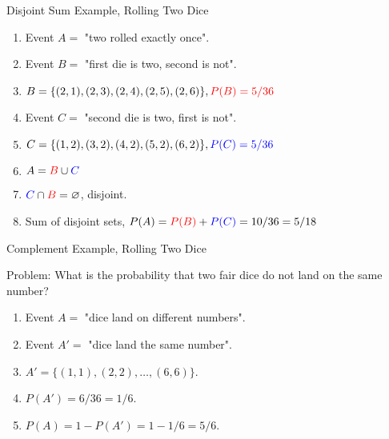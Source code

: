 \documentclass{beamer}
\newcommand{\blue}[1]{{\color{blue} #1}}
\newcommand{\red}[1]{{\color{red} #1}}
\let\emptyset\varnothing
\begin{document}
    \begin{frame}{Disjoint Sum Example, Rolling Two Dice}
        \begin{enumerate}
            \item Event $A =$ "two rolled exactly once".
            \item Event $B =$ "first die is two, second is not".
            \item $B = \{ (2,1),(2,3),(2,4),(2,5),(2,6) \}, \red{P(B) = 5/36}$
            \item Event $C =$ "second die is two, first is not".
            \item $C = \{ (1,2),(3,2),(4,2),(5,2),(6,2) \}, \blue{P(C) = 5/36}$
            \item $A = \red{B} \cup \blue{C}$
            \item $\blue{C} \cap \red{B} = \emptyset$, disjoint.
            \item Sum of disjoint sets, $P(A) = \red{P(B)} + \blue{P(C)} = 10/36 = 5/18$
        \end{enumerate}

    \end{frame}

    \begin{frame}{Complement Example, Rolling Two Dice}
        
        Problem: What is the probability that two fair dice do not land on the same number?\\
        
        \begin{enumerate}
            \item Event $A =$ "dice land on different numbers".
            \item Event $A' =$ "dice land the same number".
            \item $A' = \{ (1,1), (2,2), \ldots, (6,6) \}$.
            \item $P(A') = 6/36 = 1/6$.
            \item $P(A) = 1 - P(A') = 1 - 1/6 = 5/6$.
        \end{enumerate}
    \end{frame}
\end{document}

